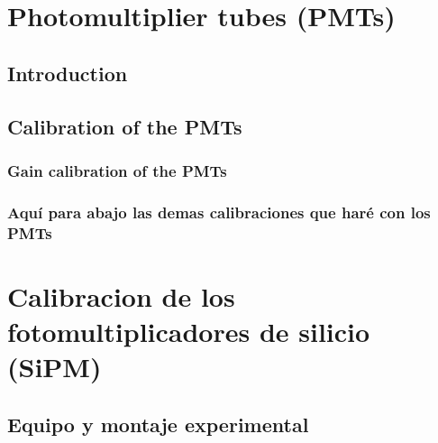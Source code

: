 \documentclass[12pt,a4paper]{book}
\begin{document}

\chapter{Photomultiplier tubes (PMTs)} \label{sec:PMT}
%
	\section{Introduction}\label{sec:IntroductionPMTs}
	
	\section{Calibration of the PMTs}\label{sec:CalibrationPMTs}
	
	\subsection{Gain calibration of the PMTs}\label{sec:GainCalibrationPMTs}
	
	\subsection{Aquí para abajo las demas calibraciones que haré con los PMTs}\label{sec:demáscalibraciones}

\chapter{Calibracion de los fotomultiplicadores de silicio (SiPM)} \label{chap:SiPM}
	\section{Equipo y montaje experimental}\label{sec:Equipo}
	
	
\end{document}
